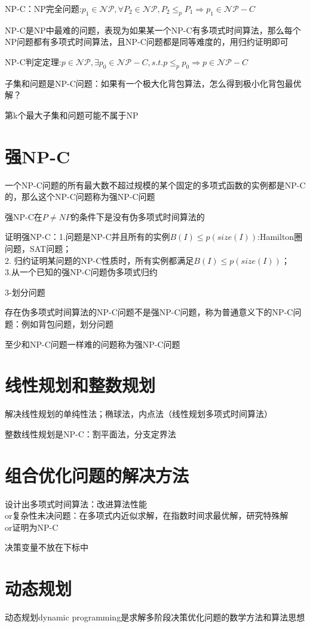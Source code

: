 \documentclass[12pt, a4paper, oneside]{ctexart}
\begin{document}
NP-C：NP完全问题:$p_1\in\mathcal{NP},\forall P_2\in\mathcal{NP},P_2\leq _pP_1\Rightarrow p_1\in\mathcal{NP}-C$

NP-C是NP中最难的问题，表现为如果某一个NP-C有多项式时间算法，那么每个NP问题都有多项式时间算法，且NP-C问题都是同等难度的，用归约证明即可

NP-C判定定理:$p\in\mathcal{NP},\exists p_0\in\mathcal{NP-}C,s.t.p\leq _pp_0\Rightarrow p\in\mathcal{NP}-C$

子集和问题是NP-C问题：如果有一个极大化背包算法，怎么得到极小化背包最优解？

第k个最大子集和问题可能不属于NP

\section*{强NP-C}
一个NP-C问题的所有最大数不超过规模的某个固定的多项式函数的实例都是NP-C的，那么这个NP-C问题称为强NP-C问题

强NP-C在$P\neq NP$的条件下是没有伪多项式时间算法的

证明强NP-C：1.问题是NP-C并且所有的实例$B(I)\leq p(size(I))$:Hamilton圈问题，SAT问题； \\
2. 归约证明某问题的NP-C性质时，所有实例都满足$B(I)\leq p(size(I))$；\\
3.从一个已知的强NP-C问题伪多项式归约

3-划分问题

存在伪多项式时间算法的NP-C问题不是强NP-C问题，称为普通意义下的NP-C问题：例如背包问题，划分问题

至少和NP-C问题一样难的问题称为强NP-C问题


\section*{线性规划和整数规划}

解决线性规划的单纯性法；椭球法，内点法（线性规划多项式时间算法）

整数线性规划是NP-C：割平面法，分支定界法

\section*{组合优化问题的解决方法}
设计出多项式时间算法：改进算法性能\\
or复杂性未决问题：在多项式内近似求解，在指数时间求最优解，研究特殊解\\
or证明为NP-C

决策变量不放在下标中


\section{动态规划}
动态规划dynamic programming是求解多阶段决策优化问题的数学方法和算法思想
\end{document}
